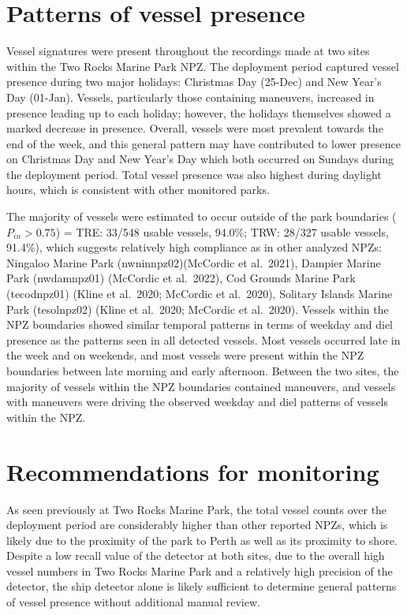 \documentclass[
  letterpaper,
  oneside,
  open=any]{scrbook}
\begin{document}
\section{Patterns of vessel presence}\label{patterns-of-vessel-presence}

Vessel signatures were present throughout the recordings made at two
sites within the Two Rocks Marine Park NPZ. The deployment period
captured vessel presence during two major holidays: Christmas Day
(25-Dec) and New Year's Day (01-Jan). Vessels, particularly those
containing maneuvers, increased in presence leading up to each holiday;
however, the holidays themselves showed a marked decrease in presence.
Overall, vessels were most prevalent towards the end of the week, and
this general pattern may have contributed to lower presence on Christmas
Day and New Year's Day which both occurred on Sundays during the
deployment period. Total vessel presence was also highest during
daylight hours, which is consistent with other monitored parks.

The majority of vessels were estimated to occur outside of the park
boundaries (\(P_{in} > 0.75\)) = TRE: 33/548 usable vessels, 94.0\%;
TRW: 28/327 usable vessels, 91.4\%), which suggests relatively high
compliance as in other analyzed NPZs: Ningaloo Marine Park
(nwninnpz02)(McCordic et al.~2021), Dampier Marine Park (nwdamnpz01)
(McCordic et al.~2022), Cod Grounds Marine Park (tecodnpz01) (Kline et
al.~2020; McCordic et al.~2020), Solitary Islands Marine Park
(tesolnpz02) (Kline et al.~2020; McCordic et al.~2020). Vessels within
the NPZ boundaries showed similar temporal patterns in terms of weekday
and diel presence as the patterns seen in all detected vessels. Most
vessels occurred late in the week and on weekends, and most vessels were
present within the NPZ boundaries between late morning and early
afternoon. Between the two sites, the majority of vessels within the NPZ
boundaries contained maneuvers, and vessels with maneuvers were driving
the observed weekday and diel patterns of vessels within the NPZ.

\section{Recommendations for
monitoring}\label{recommendations-for-monitoring}

As seen previously at Two Rocks Marine Park, the total vessel counts
over the deployment period are considerably higher than other reported
NPZs, which is likely due to the proximity of the park to Perth as well
as its proximity to shore. Despite a low recall value of the detector at
both sites, due to the overall high vessel numbers in Two Rocks Marine
Park and a relatively high precision of the detector, the ship detector
alone is likely sufficient to determine general patterns of vessel
presence without additional manual review.
\end{document}
